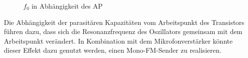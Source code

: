 \begin{figure}[H]
	\centering \small
	
	\caption{$f_0$ in Abhängigkeit des AP}
	\label{fig_Kap2_09:AP}
\end{figure}

Die Abhängigkeit der parasitären Kapazitäten vom Arbeitspunkt des Transistors führen dazu, dass sich die Resonanzfrequenz des Oszillators gemeinsam mit dem Arbeitspunkt verändert. In Kombination mit dem Mikrofonverstärker könnte dieser Effekt dazu genutzt werden, einen Mono-FM-Sender zu realisieren.



